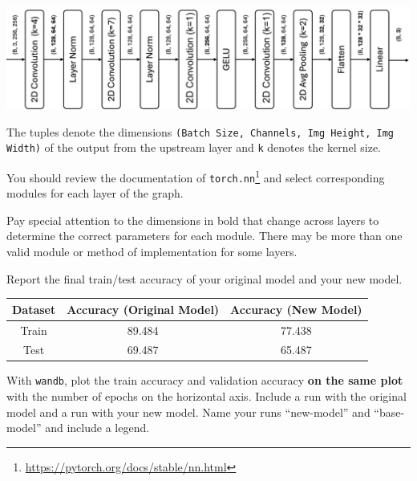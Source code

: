 \documentclass[11pt,addpoints,answers]{exam}
\begin{document}
\begin{questions}
\begin{parts}
\includegraphics[scale=0.19]{fig/new_graph_hw0.png}

The tuples denote the dimensions \lstinline{(Batch Size, Channels, Img Height, Img Width)} of the output from the upstream layer and \lstinline{k} denotes the kernel size.

You should review the documentation of \lstinline{torch.nn}\footnote{\url{https://pytorch.org/docs/stable/nn.html}} and select corresponding modules for each layer of the graph. 

Pay special attention to the dimensions in bold that change across layers to determine the correct parameters for each module. There may be more than one valid module or method of implementation for some layers.

\clearpage

\begin{subparts}

    \subpart[1] Report the final train/test accuracy of your original model and your new model.

        \begin{answer_box}[title=,height=3cm, width=14cm]
        \begin{center}
            \begin{tabular}{ccc}
                \toprule
                Dataset  & Accuracy (Original Model) & Accuracy (New Model) \\
                \midrule
                Train  & 89.484 & 77.438 \\
                Test  & 69.487 & 65.487 \\
                \bottomrule
            \end{tabular}

        \end{center}
        
        \end{answer_box}
        
    \subpart[4] With \lstinline{wandb}, plot the train accuracy and validation accuracy \textbf{on the same plot} with the number of epochs on the horizontal axis. Include a run with the original model and a run with your new model. Name your runs ``new-model'' and ``base-model'' and include a legend. 
        

\end{subparts}
\end{parts}
\end{questions}
\end{document}
